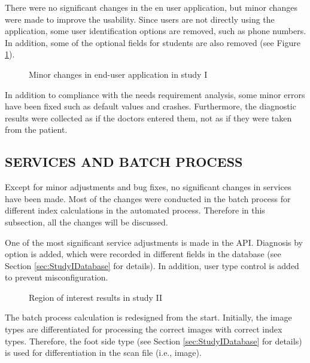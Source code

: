 There were no significant changes in the en user application, but minor changes were made to improve the usability. Since users are not directly using the application, some user identification options are removed, such as phone numbers. In addition, some of the optional fields for students are also removed (see Figure \ref{fig:UserApplicationStudyIChanges}).

\begin{figure}[htbp]
\centering
{}
\caption{Minor changes in end-user application in study I}
\label{fig:UserApplicationStudyIChanges}
\end{figure}

In addition to compliance with the needs requirement analysis, some minor errors have been fixed such as default values and crashes. Furthermore, the diagnostic results were collected as if the doctors entered them, not as if they were taken from the patient.

\subsection{SERVICES AND BATCH PROCESS}

Except for minor adjustments and bug fixes, no significant changes in services have been made. Most of the changes were conducted in the batch process for different index calculations in the automated process. Therefore in this subsection, all the changes will be discussed. 

One of the most significant service adjustments is made in the API. Diagnosis by option is added, which were recorded in different fields in the database (see Section \ref{sec:StudyIDatabase} for details). In addition, user type control is added to prevent misconfiguration.

\begin{figure}[htbp]
\centering
{}
\caption{Region of interest results in study II}
\label{fig:BatchProcessRioStudyII}
\end{figure}

The batch process calculation is redesigned from the start. Initially, the image types are differentiated for processing the correct images with correct index types. Therefore, the foot side type (see Section \ref{sec:StudyIDatabase} for details) is used for differentiation in the scan file (i.e., image).

